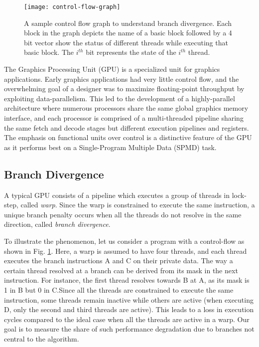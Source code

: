 %
%

\begin{figure}
	\centering
	\texttt{[image: control-flow-graph]}
	\caption{A sample control flow graph to understand branch divergence. Each block in the graph depicts the name of a basic block followed by a 4 bit vector show the status of different threads while executing that basic block. The $i^{th}$ bit represents the state of the $i^{th}$ thread.
	\label{fig:control-flow-graph}} 
\end{figure}
The Graphics Processing Unit (GPU) is a specialized unit for graphics applications. Early graphics applications had very little control flow, and the overwhelming goal of a designer was to maximize floating-point throughput by exploiting data-parallelism. This led to the development of a highly-parallel architecture where numerous processors share the same global graphics memory interface, and each processor is comprised of a multi-threaded pipeline sharing the same fetch and decode stages but different execution pipelines and registers. The emphasis on functional units over control is a distinctive feature of the GPU as it performs best on a Single-Program Multiple Data (SPMD) task.


\subsection*{Branch Divergence}
\label{sec:branch-divergence-description}
A typical GPU consists of a pipeline which executes a group of threads in lock-step, called \textsl{warp}. Since the warp is constrained to execute the same instruction, a unique branch penalty occurs when all the threads do not resolve in the same direction, called \textsl{branch divergence}. 

To illustrate the phenomenon, let us consider a program with a control-flow as shown in Fig. \ref{fig:control-flow-graph}. Here, a warp is assumed to have four threads, and each thread executes the branch instructions A and C on their private data. The way a certain thread resolved at a branch can be derived from its mask in the next instruction. For instance, the first thread resolves towards B at A, as its mask is 1 in B but 0 in C.Since all the threads are constrained to execute the same instruction, some threads remain inactive while others are active (when executing D, only the second and third threads are active). This leads to a loss in execution cycles compared to the ideal case when all the threads are active in a warp. Our goal is to measure the share of such performance degradation due to branches not central to the algorithm.

